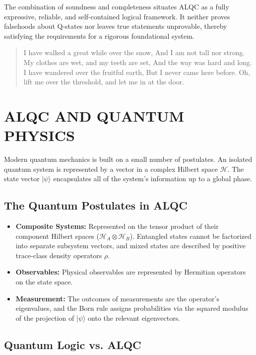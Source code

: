 \documentclass[11pt, letterpaper]{article}
\begin{document}
The combination of soundness and completeness situates ALQC as a fully expressive, reliable, and self-contained logical framework. It neither proves falsehoods about Q-states nor leaves true statements unprovable, thereby satisfying the requirements for a rigorous foundational system.

\begin{verse}
    I have walked a great while over the snow,
    And I am not tall nor strong.
    My clothes are wet, and my teeth are set,
    And the way was hard and long.
    I have wandered over the fruitful earth,
    But I never came here before.
    Oh, lift me over the threshold, and let me in at the door.
\end{verse}

\section{ALQC AND QUANTUM PHYSICS}\label{appendixK}

Modern quantum mechanics is built on a small number of postulates. An isolated quantum system is represented by a vector in a complex Hilbert space $\mathcal{H}$. The state vector $|\psi\rangle$ encapsulates all of the system's information up to a global phase.

\subsection{The Quantum Postulates in ALQC}\label{appendixK.1}

\begin{itemize}
    \item \textbf{Composite Systems:} Represented on the tensor product of their component Hilbert spaces ($\mathcal{H}_A \otimes \mathcal{H}_B$). Entangled states cannot be factorized into separate subsystem vectors, and mixed states are described by positive trace-class density operators $\rho$.
    \item \textbf{Observables:} Physical observables are represented by Hermitian operators on the state space.
    \item \textbf{Measurement:} The outcomes of measurements are the operator's eigenvalues, and the Born rule assigns probabilities via the squared modulus of the projection of $|\psi\rangle$ onto the relevant eigenvectors.
\end{itemize}

\subsection{Quantum Logic vs. ALQC}\label{appendixK.2}
\end{document}
